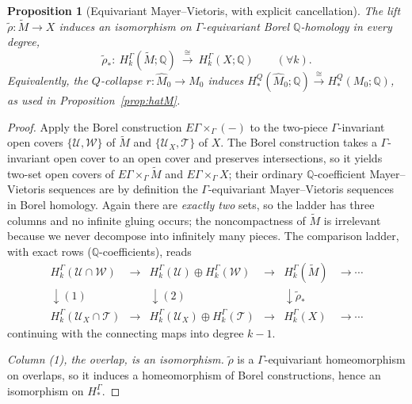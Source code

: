 \documentclass[12pt]{article}
\newtheorem{proposition}[theorem]{Proposition}
\theoremstyle{definition}
\begin{document}
\begin{proposition}[Equivariant Mayer--Vietoris, with explicit cancellation]
\label{prop:MVglobal}
The lift $\widetilde\rho\colon\widetilde M\to X$ induces an isomorphism on
$\Gamma$-equivariant Borel $\mathbb{Q}$-homology in every degree,
\[
   \widetilde\rho_*\colon\ H^\Gamma_k(\widetilde M;\mathbb{Q})\
   \xrightarrow{\ \cong\ }\ H^\Gamma_k(X;\mathbb{Q})\qquad(\forall k).
\]
Equivalently, the $Q$-collapse $r\colon\widehat M_0\to M_0$ induces
$H^Q_*(\widehat M_0;\mathbb{Q})\xrightarrow{\cong}H^Q_*(M_0;\mathbb{Q})$, as used
in Proposition~\ref{prop:hatM}.
\end{proposition}

\begin{proof}
Apply the Borel construction $E\Gamma\times_\Gamma(-)$ to the two-piece
$\Gamma$-invariant open covers $\{\mathcal U,\mathcal W\}$ of $\widetilde M$ and
$\{\mathcal U_X,\mathcal T\}$ of $X$. The Borel construction takes a
$\Gamma$-invariant open cover to an open cover and preserves intersections, so it
yields two-set open covers of $E\Gamma\times_\Gamma\widetilde M$ and
$E\Gamma\times_\Gamma X$; their ordinary $\mathbb{Q}$-coefficient Mayer--Vietoris
sequences are by definition the $\Gamma$-equivariant Mayer--Vietoris sequences in
Borel homology. Again there are \emph{exactly two} sets, so the ladder has three
columns and no infinite gluing occurs; the noncompactness of $\widetilde M$ is
irrelevant because we never decompose into infinitely many pieces. The comparison
ladder, with exact rows ($\mathbb{Q}$-coefficients), reads
\[
\begin{array}{ccccccc}
H^\Gamma_k(\mathcal U\!\cap\!\mathcal W) &\!\to\!&
H^\Gamma_k(\mathcal U)\!\oplus\! H^\Gamma_k(\mathcal W) &\!\to\!&
H^\Gamma_k(\widetilde M) &\!\to\! \cdots\\[2pt]
\downarrow{\scriptstyle (1)} && \downarrow{\scriptstyle (2)} &&
\downarrow{\scriptstyle\widetilde\rho_*} &\\[2pt]
H^\Gamma_k(\mathcal U_X\!\cap\!\mathcal T) &\!\to\!&
H^\Gamma_k(\mathcal U_X)\!\oplus\! H^\Gamma_k(\mathcal T) &\!\to\!&
H^\Gamma_k(X) &\!\to\! \cdots
\end{array}
\]
continuing with the connecting maps into degree $k-1$.

\emph{Column (1), the overlap, is an isomorphism.} $\widetilde\rho$ is a
$\Gamma$-equivariant homeomorphism on overlaps, so it induces a homeomorphism of
Borel constructions, hence an isomorphism on $H^\Gamma_*$.


\end{proof}
\end{document}
